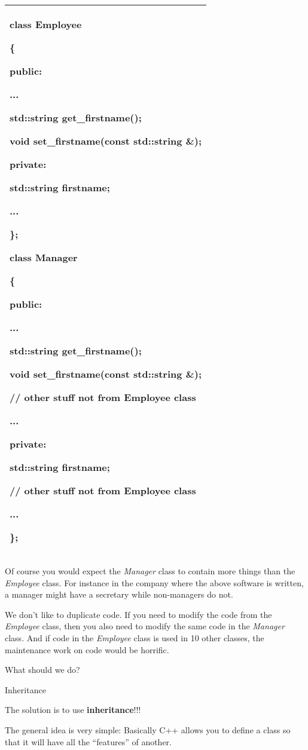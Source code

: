 \documentclass[
]{article}
\begin{document}
\begin{longtable}[]{@{}l@{}}
\toprule
\endhead
\begin{minipage}[t]{0.97\columnwidth}\raggedright
class Employee

\{

public:

...

std::string get\_firstname();

void set\_firstname(const std::string \&);

private:

std::string firstname;

...

\};

class Manager

\{

public:

...

std::string get\_firstname();

void set\_firstname(const std::string \&);

// other stuff not from Employee class

...

private:

std::string firstname;

// other stuff not from Employee class

...

\};\strut
\end{minipage}\tabularnewline
\bottomrule
\end{longtable}

Of course you would expect the \emph{Manager} class to contain more
things than the \emph{Employee} class. For instance in the company where
the above software is written, a manager might have a secretary while
non-managers do not.

We don't like to duplicate code. If you need to modify the code from the
\emph{Employee} class, then you also need to modify the same code in the
\emph{Manager} class. And if code in the \emph{Employee} class is used
in 10 other classes, the maintenance work on code would be horrific.

What should we do?

Inheritance

The solution is to use \textbf{inheritance}!!!

The general idea is very simple: Basically C++ allows you to define a
class so that it will have all the ``features'' of another.
\end{document}
